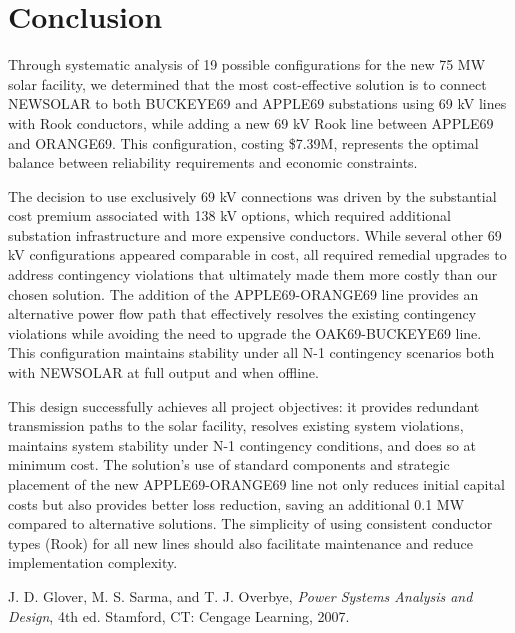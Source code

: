 \documentclass[conference]{IEEEtran}
\begin{document}
\section{Conclusion}
Through systematic analysis of 19 possible configurations for the new 75 MW solar facility, we determined that the most cost-effective solution is to connect NEWSOLAR to both BUCKEYE69 and APPLE69 substations using 69 kV lines with Rook conductors, while adding a new 69 kV Rook line between APPLE69 and ORANGE69. This configuration, costing \$7.39M, represents the optimal balance between reliability requirements and economic constraints.

The decision to use exclusively 69 kV connections was driven by the substantial cost premium associated with 138 kV options, which required additional substation infrastructure and more expensive conductors. While several other 69 kV configurations appeared comparable in cost, all required remedial upgrades to address contingency violations that ultimately made them more costly than our chosen solution. The addition of the APPLE69-ORANGE69 line provides an alternative power flow path that effectively resolves the existing contingency violations while avoiding the need to upgrade the OAK69-BUCKEYE69 line. This configuration maintains stability under all N-1 contingency scenarios both with NEWSOLAR at full output and when offline.

This design successfully achieves all project objectives: it provides redundant transmission paths to the solar facility, resolves existing system violations, maintains system stability under N-1 contingency conditions, and does so at minimum cost. The solution's use of standard components and strategic placement of the new APPLE69-ORANGE69 line not only reduces initial capital costs but also provides better loss reduction, saving an additional 0.1 MW compared to alternative solutions. The simplicity of using consistent conductor types (Rook) for all new lines should also facilitate maintenance and reduce implementation complexity.
\begin{thebibliography}{9}
	 J. D. Glover, M. S. Sarma, and T. J. Overbye, \textit{Power Systems Analysis and Design}, 4th ed. Stamford, CT: Cengage Learning, 2007.
\end{thebibliography}
\end{document}
